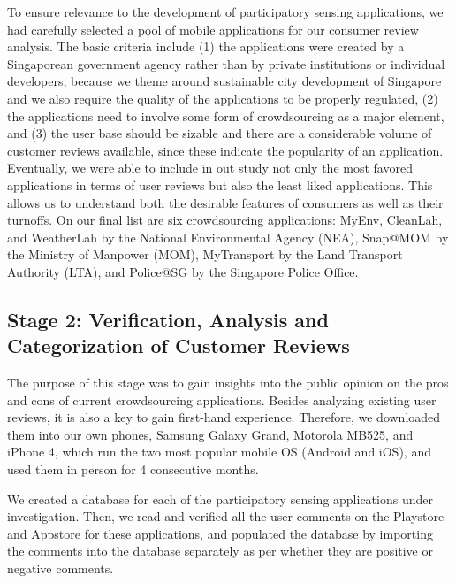 \documentclass[conference,10pt]{IEEEtran}
\begin{document}
To ensure relevance to the development of participatory sensing applications, we had carefully selected a pool of mobile applications for our consumer review analysis. The basic criteria include (1) the applications were created by a Singaporean government agency rather than by private institutions or individual developers, because we theme around sustainable city development of Singapore and we also require the quality of the applications to be properly regulated, (2) the applications need to involve some form of crowdsourcing as a major element, and (3) the user base should be sizable and there are a considerable volume of customer reviews available, since these indicate the popularity of an application. Eventually, we were able to include in out study not only the most favored applications in terms of user reviews but also the least liked applications. This allows us to understand both the desirable features of consumers as well as their turnoffs. On our final list are six crowdsourcing applications: MyEnv\cite{myENV}, CleanLah\cite{CleanLah}, and WeatherLah\cite{WeatherLah} by the National Environmental Agency (NEA), Snap@MOM\cite{SnapatMOM} by the Ministry of Manpower (MOM), MyTransport\cite{MyTransport} by the Land Transport Authority (LTA), and Police@SG\cite{PoliceSG} by the Singapore Police Office.

\subsection{Stage 2: Verification, Analysis and Categorization of Customer Reviews}\label{sec:algo}

The purpose of this stage was to gain insights into the public opinion on the pros and cons of current crowdsourcing applications. Besides analyzing existing user reviews, it is also a key to gain first-hand experience. Therefore, we downloaded them into our own phones, Samsung Galaxy Grand, Motorola MB525, and iPhone 4, which run the two most popular mobile OS (Android and iOS), and used them in person for 4 consecutive months. 

We created a database for each of the participatory sensing applications under investigation. Then, we read and verified all the user comments on the Playstore and Appstore for these applications, and populated the database by importing the comments into the database separately as per whether they are positive or negative comments.
\end{document}
